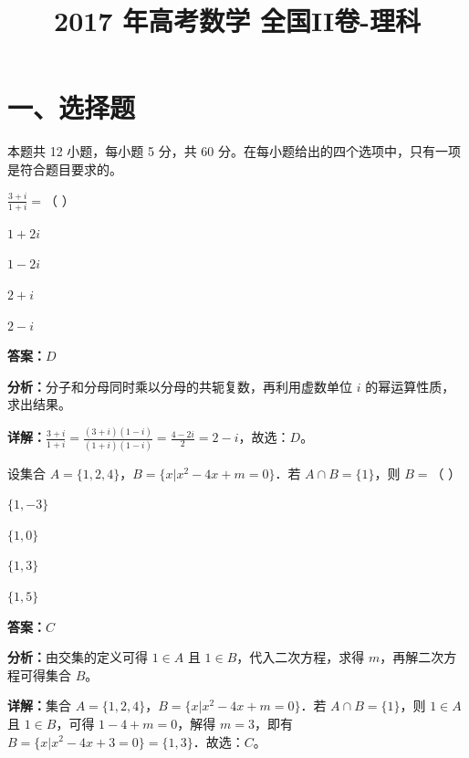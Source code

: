 ﻿\title{2017 年高考数学 全国II卷-理科}
\date{}
\maketitle

\section*{一、选择题}
本题共 12 小题，每小题 5 分，共 60 分。在每小题给出的四个选项中，只有一项是符合题目要求的。

\begin{question}[points=5]
$\frac{3+i}{1+i}=$（   ）
\begin{choices}
  \item $1+2i$
  \item $1-2i$
  \item $2+i$
  \item $2-i$
\end{choices}
\begin{solution}
\textbf{答案：}$D$

\textbf{分析：}分子和分母同时乘以分母的共轭复数，再利用虚数单位 $i$ 的幂运算性质，求出结果。

\textbf{详解：}$\frac{3+i}{1+i}=\frac{(3+i)(1-i)}{(1+i)(1-i)}=\frac{4-2i}{2}=2-i$，故选：$D$。
\end{solution}
\end{question}

\begin{question}[points=5]
设集合 $A=\{1,2,4\}$，$B=\{x|x^2-4x+m=0\}$．若 $A\cap B=\{1\}$，则 $B=$（   ）
\begin{choices}
  \item $\{1,-3\}$
  \item $\{1,0\}$
  \item $\{1,3\}$
  \item $\{1,5\}$
\end{choices}
\begin{solution}
\textbf{答案：}$C$

\textbf{分析：}由交集的定义可得 $1\in A$ 且 $1\in B$，代入二次方程，求得 $m$，再解二次方程可得集合 $B$。

\textbf{详解：}集合 $A=\{1,2,4\}$，$B=\{x|x^2-4x+m=0\}$．若 $A\cap B=\{1\}$，则 $1\in A$ 且 $1\in B$，可得 $1-4+m=0$，解得 $m=3$，即有 $B=\{x|x^2-4x+3=0\}=\{1,3\}$．故选：$C$。
\end{solution}
\end{question}


